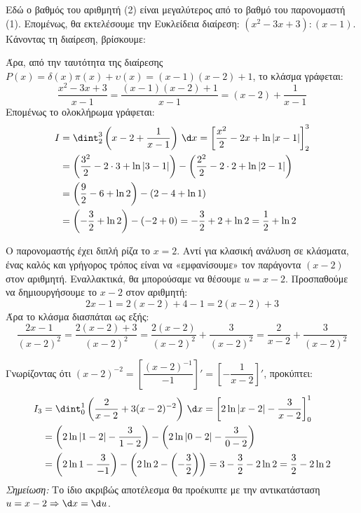 \lysh
Εδώ ο βαθμός του αριθμητή (2) είναι μεγαλύτερος από το βαθμό του παρονομαστή (1). Επομένως, θα εκτελέσουμε την Ευκλείδεια διαίρεση: $(x^2 - 3x + 3) : (x - 1)$. Κάνοντας τη διαίρεση, βρίσκουμε:
\begin{center}
\end{center}
Άρα, από την ταυτότητα της διαίρεσης $P(x) = \delta(x)\pi(x) + \upsilon(x)=(x-1)(x-2)+1$, το κλάσμα γράφεται:
\[ \frac{x^2 - 3x + 3}{x - 1} =\dfrac{(x-1)(x-2)+1}{x-1}= (x - 2) + \frac{1}{x - 1} \]
Επομένως το ολοκλήρωμα γράφεται:
\begin{align*}
I &= \dint_2^3 \left( x - 2 + \frac{1}{x - 1} \right) \, \d x = \left[ \frac{x^2}{2} - 2x + \ln|x - 1| \right]_2^3 \\
&= \left( \frac{3^2}{2} - 2\cdot3 + \ln|3 - 1| \right) - \left( \frac{2^2}{2} - 2\cdot2 + \ln|2 - 1| \right) \\
&= \left( \frac{9}{2} - 6 + \ln{2} \right) - (2 - 4 + \ln{1}) \\
&= \left( -\frac{3}{2} + \ln{2} \right) - (-2 + 0) = -\frac{3}{2} + 2 + \ln{2} = \frac{1}{2} + \ln{2}
\end{align*}

\lysh
Ο παρονομαστής έχει διπλή ρίζα το $x=2$. Αντί για κλασική ανάλυση σε κλάσματα, ένας καλός και γρήγορος τρόπος είναι να «εμφανίσουμε» τον παράγοντα $(x-2)$ στον αριθμητή. Εναλλακτικά, θα μπορούσαμε να θέσουμε $u = x - 2$. Προσπαθούμε να δημιουργήσουμε το $x-2$ στον αριθμητή:
\[ 2x - 1 = 2(x - 2) + 4 - 1 = 2(x - 2) + 3 \]
Άρα το κλάσμα διασπάται ως εξής:
\[ \frac{2x - 1}{(x - 2)^2} = \frac{2(x - 2) + 3}{(x - 2)^2} = \frac{2(x - 2)}{(x - 2)^2} + \frac{3}{(x - 2)^2} = \frac{2}{x - 2} + \frac{3}{(x - 2)^2} \]

Γνωρίζοντας ότι $(x-2)^{-2} = \left[ \dfrac{(x-2)^{-1}}{-1}\right]' = \left[ -\dfrac{1}{x-2}\right]' $, προκύπτει:
\begin{align*}
I_3 &= \dint_0^1 \left( \frac{2}{x - 2} + 3(x - 2)^{-2} \right) \, \d x = \left[ 2\ln|x - 2| - \frac{3}{x - 2} \right]_0^1 \\
&= \left( 2\ln|1 - 2| - \frac{3}{1 - 2} \right) - \left( 2\ln|0 - 2| - \frac{3}{0 - 2} \right) \\
&= \left( 2\ln1 - \frac{3}{-1} \right) - \left( 2\ln2 - \left(-\frac{3}{2}\right) \right) = 3 - \frac{3}{2} - 2\ln{2} = \frac{3}{2} - 2\ln{2}
\end{align*}
\textit{Σημείωση:} Το ίδιο ακριβώς αποτέλεσμα θα προέκυπτε με την αντικατάσταση $u = x - 2 \Rightarrow \d x = \d u$.\\

